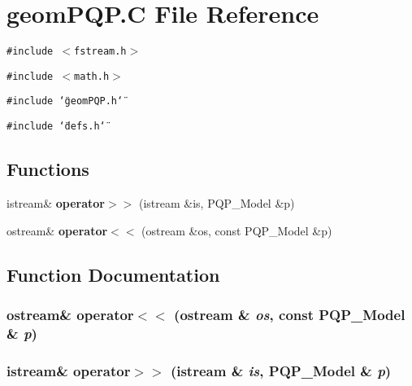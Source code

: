 \section{geom\-PQP.C File Reference}
\label{geomPQP_C}
{\tt \#include $<$fstream.h$>$}\par
{\tt \#include $<$math.h$>$}\par
{\tt \#include \char`\"{}geom\-PQP.h\char`\"{}}\par
{\tt \#include \char`\"{}defs.h\char`\"{}}\par
\subsection*{Functions}
\begin{CompactItemize}
\item 
istream\& {\bf operator$>$$>$} (istream \&is, PQP\_\-Model \&p)
\item 
ostream\& {\bf operator$<$$<$} (ostream \&os, const PQP\_\-Model \&p)
\end{CompactItemize}


\subsection{Function Documentation}
\subsubsection{\setlength{\rightskip}{0pt plus 5cm}ostream\& operator$<$$<$ (ostream \& {\em os}, const PQP\_\-Model \& {\em p})}\label{geomPQP_C_a1}


\subsubsection{\setlength{\rightskip}{0pt plus 5cm}istream\& operator$>$$>$ (istream \& {\em is}, PQP\_\-Model \& {\em p})}\label{geomPQP_C_a0}


